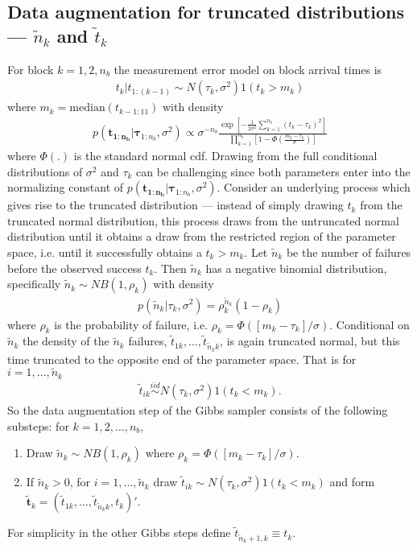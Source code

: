 \documentclass{article}
\begin{document}
\subsection{Data augmentation for truncated distributions --- $\tilde{n}_k$ and $\tilde{t}_k$}
For block $k=1,2,n_{b}$ the measurement error model on block arrival times is
\begin{align*}
t_k|t_{1:(k-1)} \sim N(\tau_k,\sigma^2)1(t_k > m_k)
\end{align*}
where $m_k = \mathrm{median}(t_{k - 1:11})$ with density 
\begin{align*}
p(\bm{t_{1:n_{b}}}|\bm{\tau}_{1:n_{b}},\sigma^2) \propto \sigma^{-n_{b}}\frac{\exp\left[-\frac{1}{2\sigma^2}\sum_{k=1}^{n_{b}}(t_k - \tau_k)^2\right]}{\prod_{k=1}^{n_{b}}\left[1 - \Phi\left(\frac{m_k - \tau_k}{\sigma}\right)\right]}
\end{align*}
where $\Phi(.)$ is the standard normal cdf. Drawing from the full conditional distributions of $\sigma^2$ and $\tau_k$ can be challenging since both parameters enter into the normalizing constant of $p(\bm{t_{1:n_{b}}}|\bm{\tau}_{1:n_{b}},\sigma^2)$. Consider an underlying process which gives rise to the truncated distribution --- instead of simply drawing $t_k$ from the truncated normal distribution, this process draws from the untruncated normal distribution until it obtains a draw from the restricted region of the parameter space, i.e. until it successfully obtains a $t_k > m_k$. Let $\tilde{n}_k$ be the number of failures before the observed success $t_k$. Then $\tilde{n}_k$ has a negative binomial distribution, specifically $\tilde{n}_k \sim NB(1, \rho_k)$ with density
\begin{align*}
p(\tilde{n}_k|\tau_k,\sigma^2) = \rho_k^{\tilde{n}_k}(1 - \rho_k)
\end{align*}
where $\rho_k$ is the probability of failure, i.e. $\rho_k = \Phi([m_k - \tau_k]/\sigma)$. Conditional on $\tilde{n}_k$ the density of the $\tilde{n}_k$ failures, $\tilde{t}_{1k},\dots,\tilde{t}_{\tilde{n}_kk}$, is again truncated normal, but this time truncated to the opposite end of the parameter space. That is for $i = 1,\dots,\tilde{n}_k$
\begin{align*}
\tilde{t}_{ik}\stackrel{iid}{\sim}N(\tau_k,\sigma^2)1(t_k < m_k).
\end{align*}
So the data augmentation step of the Gibbs sampler consists of the following substeps: for $k=1,2,\dots,n_{b}$,
\begin{enumerate}
\item Draw $\tilde{n}_k \sim NB(1,\rho_k)$ where $\rho_k = \Phi([ m_k -  \tau_k]/\sigma)$.
\item If $\tilde{n}_k > 0$, for $i=1,\dots,\tilde{n}_k$ draw $\tilde{t}_{ik} \sim N(\tau_k,\sigma^2)1(t_k < m_k)$ and form $\tilde{\bm{t}}_k = (\tilde{t}_{1k},\dots,\tilde{t}_{\tilde{n}_kk}, t_k)'$.
\end{enumerate}
For simplicity in the other Gibbs steps define $\tilde{t}_{\tilde{n}_k + 1,k}\equiv t_k$.
\end{document}

